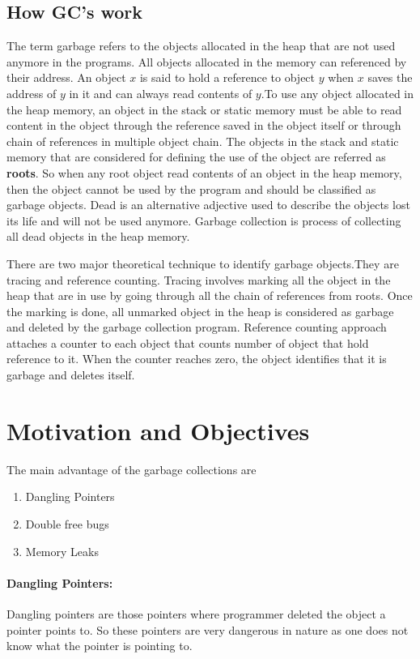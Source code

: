 \subsection{How GC's work}
The term garbage refers to the objects allocated in the heap that are not used anymore in the programs. All objects allocated in the memory can referenced by their address. An object $x$ is said to hold a reference to object $y$ when $x$ saves the address of $y$ in it and can always read contents of $y$.To use any object allocated in the heap memory, an object in the stack or static memory must be able to read content in the object through the reference saved in the object itself or through chain of references in multiple object chain.
The objects in the stack and static memory that are considered for defining the use of the object are referred as \textbf{roots}.
So when any root object read contents of an object in the heap memory, then the object cannot be used by the program and should be classified as garbage objects. Dead is an alternative adjective used to describe the objects lost its life and will not be used anymore. Garbage collection is process of collecting all dead objects in the heap memory. 

There are two major theoretical technique to identify garbage objects.They are tracing and reference counting. Tracing involves marking all the object in the heap that are in use by going through all the chain of references from roots. Once the marking is done, all unmarked object in the heap is considered as garbage and deleted by the garbage collection program. Reference counting approach attaches a counter to each object that counts number of object that hold reference to it. When the counter reaches zero, the object identifies that it is garbage and deletes itself.

\section{Motivation and Objectives}
\label{intro:motv}
The main advantage of the garbage collections are 
\begin{enumerate}
	\item Dangling Pointers
	\item Double free bugs
	\item Memory Leaks
\end{enumerate}
\paragraph{Dangling Pointers:}
	Dangling pointers are those pointers where programmer deleted the object a pointer points to. So these pointers are very dangerous in nature as one does not know what the pointer is pointing to.
